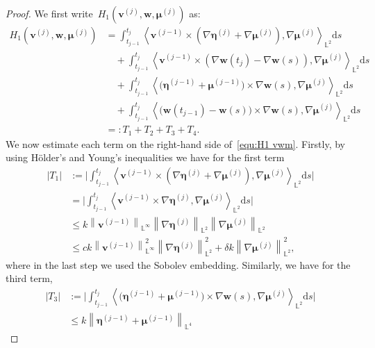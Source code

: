 \documentclass[10pt,a4paper]{amsart}
\newcommand{\bb}{\mathbb}
\newcommand{\bff}{\boldsymbol}
\newcommand{\ds}{\mathrm{d}s}
\newcommand{\inpro}[2]{\left\langle#1,#2\right\rangle}
\newcommand{\nn}{\nonumber}
\newcommand{\norm}[2]{\left\|{#1}\right\|_{#2}}
\begin{document}
\begin{proof}
	We first write~$H_1(\bff{v}^{(j)},\bff{w},\bff{\mu}^{(j)})$ as:
	\begin{align}\label{equ:H1 vwm} 
		H_1(\bff{v}^{(j)},\bff{w},\bff{\mu}^{(j)})
		&=
		\int_{t_{j-1}}^{t_j} 
		\inpro{\bff{v}^{(j-1)} \times (\nabla\bff{\eta}^{(j)} +
			\nabla\bff{\mu}^{(j)})}{\nabla\bff{\mu}^{(j)}}_{\bb{L}^2} \ds
		\nn\\
		&\quad +
		\int_{t_{j-1}}^{t_j} 
		\inpro{\bff{v}^{(j-1)} \times (\nabla\bff{w}(t_j) -
			\nabla\bff{w}(s))}{\nabla\bff{\mu}^{(j)}}_{\bb{L}^2} \ds
		\nn\\
		&\quad +
		\int_{t_{j-1}}^{t_j} 
		\inpro{
			\big(\bff{\eta}^{(j-1)} + \bff{\mu}^{(j-1)}\big)
			\times \nabla\bff{w}(s)}{\nabla\bff{\mu}^{(j)}}_{\bb{L}^2} \ds
		\nn\\
		&\quad +
		\int_{t_{j-1}}^{t_j} 
		\inpro{
			\big(\bff{w}(t_{j-1})-\bff{w}(s)\big) \times \nabla\bff{w}(s)}
		{\nabla\bff{\mu}^{(j)}}_{\bb{L}^2} \ds
		\nn\\
		&=: T_1 + T_2 + T_3 + T_4.
	\end{align}
	We now estimate each term on the right-hand side of~\eqref{equ:H1 vwm}. Firstly, by using
	H\"older's and Young's inequalities we have for the first term
	\begin{align}\label{equ:est T1}
		|T_1|
		&:=
		\Big|
		\int_{t_{j-1}}^{t_j} 
		\inpro{\bff{v}^{(j-1)} \times (\nabla\bff{\eta}^{(j)} +
			\nabla\bff{\mu}^{(j)})}{\nabla\bff{\mu}^{(j)}}_{\bb{L}^2} \ds
		\Big|
		\nn\\
		&=
		\Big|
		\int_{t_{j-1}}^{t_j} 
		\inpro{\bff{v}^{(j-1)} \times
			\nabla\bff{\eta}^{(j)}}{\nabla\bff{\mu}^{(j)}}_{\bb{L}^2} \ds 
		\Big|
		\nn\\
		&\le
		k \norm{\bff{v}^{(j-1)}}{\bb{L}^\infty} 
		\norm{\nabla\bff{\eta}^{(j)}}{\bb{L}^2} 
		\norm{\nabla\bff{\mu}^{(j)}}{\bb{L}^2} 
		\nn\\
		&\le
		ck \norm{\bff{v}^{(j-1)}}{\bb{L}^\infty}^2
			\norm{\nabla\bff{\eta}^{(j)}}{\bb{L}^2}^2
		+
		\delta k
		\norm{\nabla\bff{\mu}^{(j)}}{\bb{L}^2}^2,
	\end{align}
	where in the last step we used the Sobolev embedding.
	Similarly, we have for the third term,
	\begin{align*} 
		|T_3|
		&:=
		\Big|
		\int_{t_{j-1}}^{t_j} 
		\inpro{\big(\bff{\eta}^{(j-1)} + \bff{\mu}^{(j-1)}\big)
			\times \nabla\bff{w}(s)}{\nabla\bff{\mu}^{(j)}}_{\bb{L}^2} \ds
		\Big|
		\\
		&\le
		k
		\norm{\bff{\eta}^{(j-1)} + \bff{\mu}^{(j-1)}}{\bb{L}^4} 

\end{align*}
\end{proof}
\end{document}
